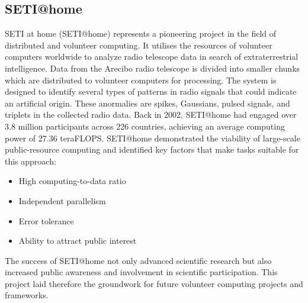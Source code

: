 \subsection{SETI@home}
\label{subsec:background:related_work:seti}
\ac{SETI} at home (SETI@home) represents a pioneering project in the field of distributed and volunteer computing. It utilises the resources of volunteer computers worldwide to analyze radio telescope data in search of extraterrestrial intelligence. Data from the Arecibo radio telescope is divided into smaller chunks which are distributed to volunteer computers for processing. The system is designed to identify several types of patterns in radio signals that could indicate an artificial origin. These anormalies are spikes, Gaussians, pulsed signals, and triplets in the collected radio data.
Back in 2002, \ac{SETI}@home had engaged over 3.8 million participants across 226 countries, achieving an average computing power of 27.36 teraFLOPS.
SETI@home demonstrated the viability of large-scale public-resource computing and identified key factors that make tasks suitable for this approach:
\begin{itemize}
\item High computing-to-data ratio
\item Independent parallelism
\item Error tolerance
\item Ability to attract public interest
\end{itemize}
The success of \ac{SETI}@home not only advanced scientific research but also increased public awareness and involvement in scientific participation. This project laid therefore the groundwork for future volunteer computing projects and frameworks. \cite{relatedwork:seti}
